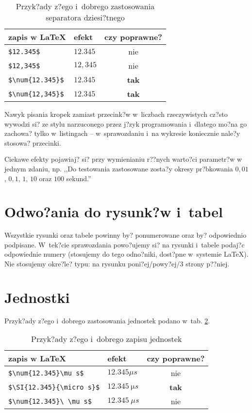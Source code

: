 \begin{table}[H]
	\caption{Przyk?ady z?ego i~dobrego zastosowania separatora dziesi?tnego}
	\label{t_przecinki_kropki}
\centering
\begin{tabular}{llc}
	zapis w \LaTeX & efekt & czy poprawne? \\ \hline
	\verb+$12.345$+ & $12.345$ & nie \\
	\verb+$12,345$+ & $12,345$ & nie \\
	\verb+$\num{12.345}$+ & $\num{12.345}$ & \textbf{tak} \\
	\verb+$\num{12,345}$+ & $\num{12,345}$ & \textbf{tak} \\
\end{tabular}
\end{table}

Nawyk pisania kropek zamiast przecink?w w~liczbach rzeczywistych cz?sto wywodzi si? ze stylu narzuconego przez j?zyk programowania i~dlatego mo?na go zachowa? tylko w~listingach -- w~sprawozdaniu i~na wykresie koniecznie nale?y stosowa? przecinki.

Ciekawe efekty pojawiaj? si? przy wymienianiu r??nych warto?ci parametr?w w jednym zdaniu, np. ,,Do testowania zastosowane zosta?y okresy pr?bkowania $0,01$, $0,1$, $1$, $10$ oraz $100$ sekund.''

\section{Odwo?ania do rysunk?w i~tabel}
Wszystkie rysunki oraz tabele powinny by? ponumerowane oraz by? odpowiednio podpisane. W~tek?cie sprawozdania powo?ujemy si? na rysunki i~tabele podaj?c odpowiednie numery (stosujemy do tego odno?niki, dost?pne w~systemie \LaTeX). Nie stosujemy okre?le? typu: na rysunku poni?ej/powy?ej/3 strony p??niej.

\section{Jednostki}
Przyk?ady z?ego i~dobrego zastosowania jednostek podano w~tab. \ref{t_jednostki}.

\begin{table}[H]
	\caption{Przyk?ady z?ego i~dobrego zapisu jednostek}
	\label{t_jednostki}
\centering
\begin{tabular}{llc}
	zapis w \LaTeX & efekt & czy poprawne? \\ \hline
	\verb+$\num{12.345}\mu s$+ & $\num{12.345}\mu s$ & nie \\
	\verb+$\SI{12.345}{\micro s}$+ & $\SI{12.345}{\micro s}$ & \textbf{tak} \\
	\verb+$\num{12.345}\ \mu s$+ & $\num{12.345}\ \mu s$ & nie \\
\end{tabular}
\end{table}

